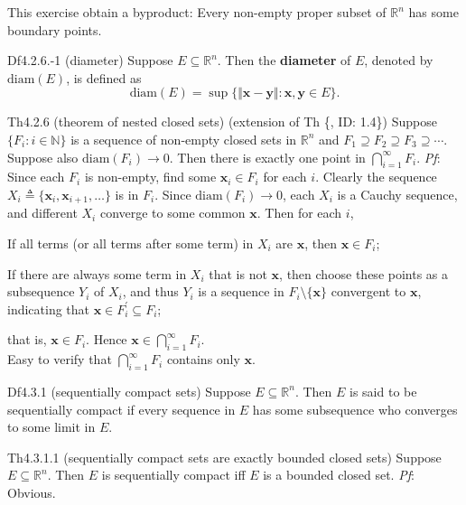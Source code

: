 \documentclass{article}
\begin{document}
\begin{Rmk}{}
    This exercise obtain a byproduct: \textcolor{Th}{Every non-empty proper subset of $\mathbb{R}^n$ has some boundary points.}
\end{Rmk}

\begin{Df}{Df4.2.6.-1 (diameter)}
    Suppose $E\subseteq\mathbb{R}^n$. Then the \textbf{diameter} of $E$, denoted by $\text{diam}(E)$, is defined as
    $$\text{diam}(E) = \sup\{\Vert\pmb{x}-\pmb{y}\Vert: \pmb{x}, \pmb{y}\in E\}.$$
\end{Df}

\begin{Th}{Th4.2.6 (theorem of nested closed sets) (extension of Th \{, ID: 1.4\})}
    Suppose $\{F_i: i\in\mathbb{N}\}$ is a sequence of non-empty closed sets in $\mathbb{R}^n$ and $F_1\supseteq F_2\supseteq F_3\supseteq \cdots$. Suppose also $\text{diam}(F_i)\rightarrow 0$. Then there is exactly one point in $\bigcap\limits_{i=1}^\infty F_i$.
    \tcblower
    \textit{Pf}: Since each $F_i$ is non-empty, find some $\pmb{x}_i\in F_i$ for each $i$. Clearly the sequence $X_i\triangleq\{\pmb{x}_i, \pmb{x}_{i+1}, \dots\}$ is in $F_i$. Since $\text{diam}(F_i)\rightarrow 0$, each $X_i$ is a Cauchy sequence, and different $X_i$ converge to some common $\pmb{x}$. Then for each $i$,
    \begin{compactenum}
        \item If all terms (or all terms after some term) in $X_i$ are $\pmb{x}$, then $\pmb{x}\in F_i$;
        \item If there are always some term in $X_i$ that is not $\pmb{x}$, then choose these points as a subsequence $Y_i$ of $X_i$, and thus $Y_i$ is a sequence in $F_i\setminus\{\pmb{x}\}$ convergent to $\pmb{x}$, indicating that $\pmb{x}\in F_i^\prime\subseteq F_i$;
    \end{compactenum}
    that is, $\pmb{x}\in F_i$. Hence $\pmb{x}\in\bigcap\limits_{i=1}^\infty F_i$.\\
    Easy to verify that $\bigcap\limits_{i=1}^\infty F_i$ contains only $\pmb{x}$.
\end{Th}

\begin{Df}{Df4.3.1 (sequentially compact sets)}
    Suppose $E\subseteq\mathbb{R}^n$. Then $E$ is said to be sequentially compact if every sequence in $E$ has some subsequence who converges to some limit in $E$.
\end{Df}

\begin{Th}{Th4.3.1.1 (sequentially compact sets are exactly bounded closed sets)}
    Suppose $E\subseteq\mathbb{R}^n$. Then $E$ is sequentially compact iff $E$ is a bounded closed set.
    \tcblower
    \textit{Pf}: Obvious.
\end{Th}
\end{document}
